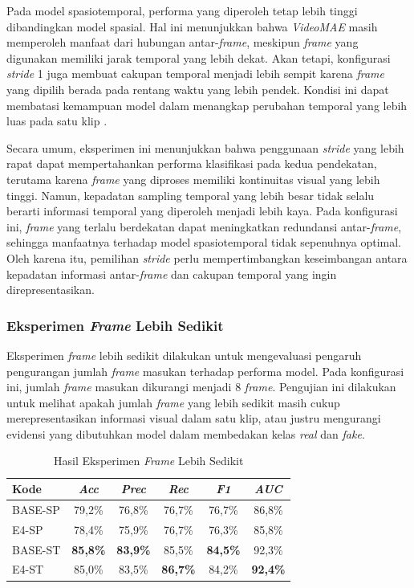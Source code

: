 Pada model spasiotemporal, performa yang diperoleh tetap lebih tinggi dibandingkan model spasial. Hal ini menunjukkan bahwa \textit{VideoMAE} masih memperoleh manfaat dari hubungan antar-\textit{frame}, meskipun \textit{frame} yang digunakan memiliki jarak temporal yang lebih dekat. Akan tetapi, konfigurasi \textit{stride} 1 juga membuat cakupan temporal menjadi lebih sempit karena \textit{frame} yang dipilih berada pada rentang waktu yang lebih pendek. Kondisi ini dapat membatasi kemampuan model dalam menangkap perubahan temporal yang lebih luas pada satu klip \cite{Gu2021}\cite{tong2022videomaemaskedautoencodersdataefficient}.

Secara umum, eksperimen ini menunjukkan bahwa penggunaan \textit{stride} yang lebih rapat dapat mempertahankan performa klasifikasi pada kedua pendekatan, terutama karena \textit{frame} yang diproses memiliki kontinuitas visual yang lebih tinggi. Namun, kepadatan sampling temporal yang lebih besar tidak selalu berarti informasi temporal yang diperoleh menjadi lebih kaya. Pada konfigurasi ini, \textit{frame} yang terlalu berdekatan dapat meningkatkan redundansi antar-\textit{frame}, sehingga manfaatnya terhadap model spasiotemporal tidak sepenuhnya optimal. Oleh karena itu, pemilihan \textit{stride} perlu mempertimbangkan keseimbangan antara kepadatan informasi antar-\textit{frame} dan cakupan temporal yang ingin direpresentasikan.

\subsubsection{Eksperimen \textit{Frame} Lebih Sedikit} \label{IV.Eksperimen_Utama_Frame_Sedikit}

Eksperimen \textit{frame} lebih sedikit dilakukan untuk mengevaluasi pengaruh pengurangan jumlah \textit{frame} masukan terhadap performa model. Pada konfigurasi ini, jumlah \textit{frame} masukan dikurangi menjadi 8 \textit{frame}. Pengujian ini dilakukan untuk melihat apakah jumlah \textit{frame} yang lebih sedikit masih cukup merepresentasikan informasi visual dalam satu klip, atau justru mengurangi evidensi yang dibutuhkan model dalam membedakan kelas \textit{real} dan \textit{fake}.

\begin{table}[htbp]
\centering
\caption{Hasil Eksperimen \textit{Frame} Lebih Sedikit}
\label{table:4.eksperimen-utama-frame-sedikit}
\begin{tabular}{lccccc}
\toprule
\textbf{Kode} &
\textbf{\textit{Acc}} &
\textbf{\textit{Prec}} &
\textbf{\textit{Rec}} &
\textbf{\textit{F1}} &
\textbf{\textit{AUC}} \\
\midrule
BASE-SP & 79,2\% & 76,8\% & 76,7\% & 76,7\% & 86,8\% \\
E4-SP & 78,4\% & 75,9\% & 76,7\% & 76,3\% & 85,8\% \\
\midrule
BASE-ST & \textbf{85,8\%} & \textbf{83,9\%} & 85,5\% & \textbf{84,5\%} & 92,3\% \\
E4-ST & 85,0\% & 83,5\% & \textbf{86,7\%} & 84,2\% & \textbf{92,4\%} \\
\bottomrule
\end{tabular}
\end{table}

